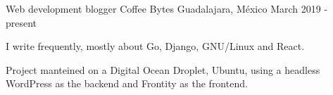 \begin{cventries}
  \cventry
    {Web development blogger}
    {Coffee Bytes}
    {Guadalajara, México}
    {March 2019 - present}
    {
      \begin{cvitems}
        \item {I write frequently, mostly about Go, Django, GNU/Linux and React.}
        \item {Project manteined on a Digital Ocean Droplet, Ubuntu, using a headless WordPress as the backend and Frontity as the frontend.}
      \end{cvitems}
    }

\end{cventries}

